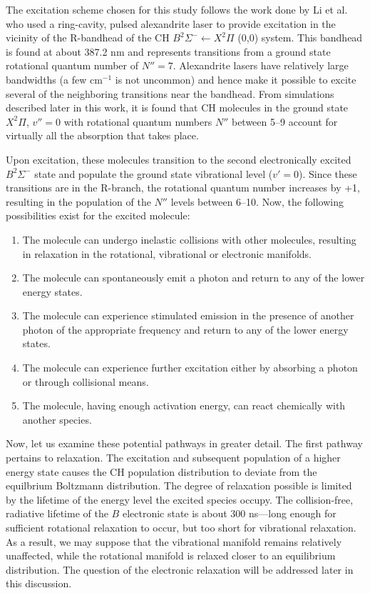The excitation scheme chosen for this study follows the work done by Li et al.\cite{2007-li-a} who used a ring-cavity, pulsed alexandrite laser to provide excitation in the vicinity of the R-bandhead of the CH \(B^2\Sigma^- \leftarrow X^2\Pi\) (0,0) system.
This bandhead is found at about 387.2 nm and represents transitions from a ground state rotational quantum number of \(N''=7\).
Alexandrite lasers have relatively large bandwidths (a few cm\(^{-1}\) is not uncommon) and hence make it possible to excite several of the neighboring transitions near the bandhead.
From simulations described later in this work, it is found that CH molecules in the ground state \(X^2\Pi\), \(v''=0\) with rotational quantum numbers \(N''\) between 5--9 account for virtually all the absorption that takes place.

Upon excitation, these molecules transition to the second electronically excited \(B^2\Sigma^-\) state and populate the ground state vibrational level (\(v'=0\)).
Since these transitions are in the R-branch, the rotational quantum number increases by +1, resulting in the population of the \(N''\) levels between 6--10.
Now, the following possibilities exist for the excited molecule:

\begin{enumerate}
  \item The molecule can undergo inelastic collisions with other molecules, resulting in relaxation in the rotational, vibrational or electronic manifolds.
  \item The molecule can spontaneously emit a photon and return to any of the lower energy states.
  \item The molecule can experience stimulated emission in the presence of another photon of the appropriate frequency and return to any of the lower energy states.
  \item The molecule can experience further excitation either by absorbing a photon or through collisional means.
  \item The molecule, having enough activation energy, can react chemically with another species.
\end{enumerate}

Now, let us examine these potential pathways in greater detail.
The first pathway pertains to relaxation.
The excitation and subsequent population of a higher energy state causes the CH population distribution to deviate from the equilbrium Boltzmann distribution.
The degree of relaxation possible is limited by the lifetime of the energy level the excited species occupy.
The collision-free, radiative lifetime of the \(B\) electronic state is about 300 ns\cite{1996-luque-c}---long enough for sufficient rotational relaxation to occur, but too short for vibrational relaxation.
As a result, we may suppose that the vibrational manifold remains relatively unaffected, while the rotational manifold is relaxed closer to an equilibrium distribution.
The question of the electronic relaxation will be addressed later in this discussion.

